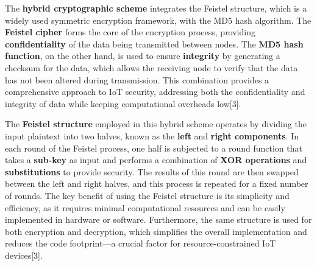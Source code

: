 \documentclass{article}
\begin{document}


The \textbf{hybrid cryptographic scheme} integrates the Feistel structure, which is a widely used symmetric encryption framework, with the MD5 hash algorithm. The \textbf{Feistel cipher} forms the core of the encryption process, providing \textbf{confidentiality} of the data being transmitted between nodes. The \textbf{MD5 hash function}, on the other hand, is used to ensure \textbf{integrity} by generating a checksum for the data, which allows the receiving node to verify that the data has not been altered during transmission. This combination provides a comprehensive approach to IoT security, addressing both the confidentiality and integrity of data while keeping computational overheads low[3].

The \textbf{Feistel structure} employed in this hybrid scheme operates by dividing the input plaintext into two halves, known as the \textbf{left} and \textbf{right components}. In each round of the Feistel process, one half is subjected to a round function that takes a \textbf{sub-key} as input and performs a combination of \textbf{XOR operations} and \textbf{substitutions} to provide security. The results of this round are then swapped between the left and right halves, and this process is repeated for a fixed number of rounds. The key benefit of using the Feistel structure is its simplicity and efficiency, as it requires minimal computational resources and can be easily implemented in hardware or software. Furthermore, the same structure is used for both encryption and decryption, which simplifies the overall implementation and reduces the code footprint—a crucial factor for resource-constrained IoT devices[3].
\end{document}
